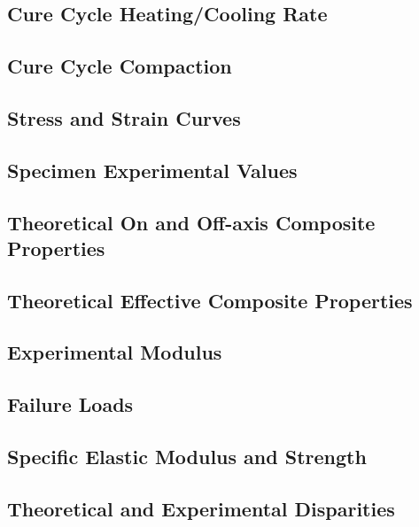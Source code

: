 \subsection{Cure Cycle Heating/Cooling Rate}


\subsection{Cure Cycle Compaction}




\subsection{Stress and Strain Curves}


\subsection{Specimen Experimental Values}


\subsection{Theoretical On and Off-axis Composite Properties}


\subsection{Theoretical Effective Composite Properties}


\clearpage
\subsection{Experimental Modulus}


\subsection{Failure Loads}


\clearpage
\subsection{Specific Elastic Modulus and Strength}


\subsection{Theoretical and Experimental Disparities}
